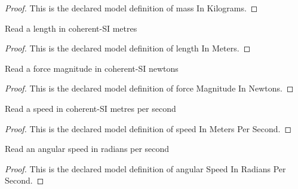 \begin{proof}
  This is the declared model definition of mass In Kilograms.
\end{proof}
\begin{definition}
  \label{def:physics:phyx-mini-0820:phyxminiproblems-problemphyxmini0820-lengthinmeters}
  Read a length in coherent-SI metres
\end{definition}
\begin{proof}
  This is the declared model definition of length In Meters.
\end{proof}
\begin{definition}
  \label{def:physics:phyx-mini-0820:phyxminiproblems-problemphyxmini0820-forcemagnitudeinnewtons}
  Read a force magnitude in coherent-SI newtons
\end{definition}
\begin{proof}
  This is the declared model definition of force Magnitude In Newtons.
\end{proof}
\begin{definition}
  \label{def:physics:phyx-mini-0820:phyxminiproblems-problemphyxmini0820-speedinmeterspersecond}
  Read a speed in coherent-SI metres per second
\end{definition}
\begin{proof}
  This is the declared model definition of speed In Meters Per Second.
\end{proof}
\begin{definition}
  \label{def:physics:phyx-mini-0820:phyxminiproblems-problemphyxmini0820-angularspeedinradianspersecond}
  Read an angular speed in radians per second
\end{definition}
\begin{proof}
  This is the declared model definition of angular Speed In Radians Per Second.
\end{proof}
